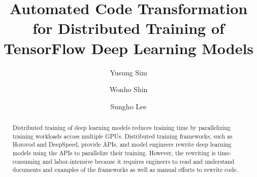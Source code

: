 \documentclass[preprint, 12pt]{elsarticle}%
\begin{document}
\begin{frontmatter}

\title{Automated Code Transformation for Distributed Training of TensorFlow Deep Learning Models}

\author[inst1]{Yusung Sim}

\author[inst1]{Wonho Shin}

\author[inst2]{Sungho Lee}










\begin{abstract}
Distributed training of deep learning models reduces training time by
parallelizing training workloads across multiple GPUs.
Distributed training frameworks, such as Horovod and DeepSpeed, provide APIs,
and model engineers rewrite deep learning models using the APIs to parallelize
their training.
However, the rewriting is time-consuming and labor-intensive because it
requires engineers to read and understand documents and examples of the
frameworks as well as manual efforts to rewrite code.


\end{abstract}
\end{frontmatter}
\end{document}
